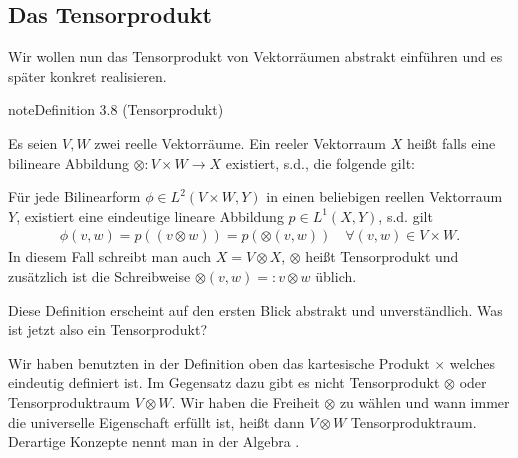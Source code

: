 \documentclass[letterpaper,10pt,english]{jupyterBook}
\begin{document}
\subsection{Das Tensorprodukt}
\label{\detokenize{vektoranalysis/tensor:das-tensorprodukt}}
\sphinxAtStartPar
Wir wollen nun das Tensorprodukt von Vektorräumen abstrakt einführen und es später konkret realisieren.
\label{vektoranalysis/tensor:definition-1}
\begin{sphinxadmonition}{note}{Definition 3.8 (Tensorprodukt)}



\sphinxAtStartPar
Es seien \(V,W\) zwei reelle Vektorräume. Ein reeler Vektorraum \(X\) heißt  falls eine bilineare Abbildung \(\otimes:V\times W\rightarrow X\) existiert, s.d., die folgende  gilt:

\sphinxAtStartPar
Für jede Bilinearform \(\phi\in L^2(V\times W, Y)\) in einen beliebigen reellen Vektorraum \(Y\), existiert eine eindeutige lineare Abbildung
\(p \in L^1(X, Y)\), s.d. gilt
\begin{equation*}
\begin{split}\phi(v,w) = p((v\otimes w)) = p(\otimes(v,w))\quad\forall (v,w)\in V\times W.\end{split}
\end{equation*}
\sphinxAtStartPar
In diesem Fall schreibt man auch \(X = V\otimes X\), \(\otimes\) heißt Tensorprodukt und zusätzlich ist die Schreibweise \(\otimes(v,w)=:v\otimes w\) üblich.
\end{sphinxadmonition}

\sphinxAtStartPar
{}

\sphinxAtStartPar
Diese Definition erscheint auf den ersten Blick abstrakt und unverständlich. Was ist jetzt also ein Tensorprodukt?

\sphinxAtStartPar
{}

\sphinxAtStartPar
Wir haben benutzten in der Definition oben das kartesische Produkt \(\times\) welches eindeutig definiert ist. Im Gegensatz dazu gibt es nicht  Tensorprodukt \(\otimes\) oder  Tensorproduktraum \(V\otimes W\). Wir haben die Freiheit \(\otimes\) zu wählen und wann immer die universelle Eigenschaft erfüllt ist, heißt dann \(V\otimes W\) Tensorproduktraum. Derartige Konzepte nennt man in der Algebra .
\end{document}
